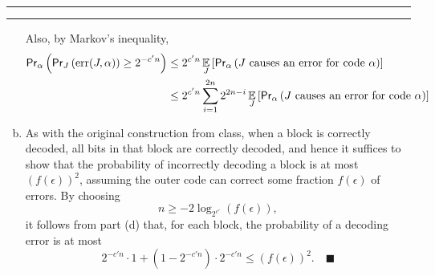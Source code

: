 \documentclass[11pt]{article}
\newcounter{questionCounter}
\newcounter{partCounter}[questionCounter]
\newenvironment{question}[2][\arabic{questionCounter}]{%
    \setcounter{partCounter}{0}%
    \vspace{.25in} \hrule \vspace{0.5em}%
        \noindent{\bf #2}%
    \vspace{0.8em} \hrule \vspace{.10in}%
    \addtocounter{questionCounter}{1}%
}{}
\newcommand{\mqed}{\quad \blacksquare}
\newcommand{\prv}[2]{\mathsf{Pr}_{#2}\left( #1 \right)}
\newcommand{\E}[2]{\operatornamewithlimits{\mathbb{E}}_{#2}\left[ #1 \right]}
\begin{document}
\begin{question}{Problem 4}
\begin{enumerate}[(a)]
Also, by Markov's inequality,
\begin{align*}
\prv{\prv{\mbox{err}(J,\alpha)}{J} \geq 2^{-c'n}}{\alpha}
 & \leq 2^{c'n}
        \E{\prv{J \mbox{ causes an error for code } \alpha}{\alpha}}{J}    \\
 & \leq 2^{c'n}
    \sum_{i = 1}^{2n} 2^{2n - i}
        \E{\prv{J \mbox{ causes an error for code } \alpha}{\alpha}}{J}    \\
\end{align*}

\item As with the original construction from class, when a block is correctly
decoded, all bits in that block are correctly decoded, and hence it suffices to
show that the probability of incorrectly decoding a block is at most
$(f(\epsilon))^2$, assuming the outer code can correct some fraction
$f(\epsilon)$ of errors. By choosing \[n \geq -2\log_{2^{c'}}(f(\epsilon)),\]
it follows from part (d) that, for each block, the probability of a decoding
error is at most
\[2^{-c'n} \cdot 1 + (1 - 2^{-c'n}) \cdot 2^{-c'n}
    \leq (f(\epsilon))^2. \mqed
\]
\end{enumerate}
\end{question}
\end{document}
